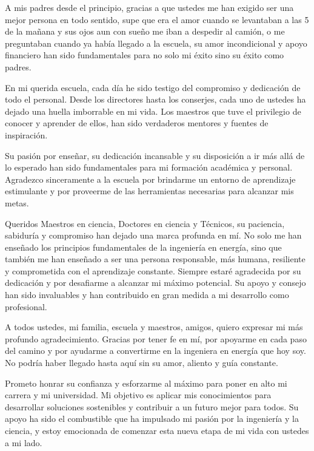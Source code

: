 \documentclass[12pt]{article}
\begin{document}
A mis padres desde el principio, gracias a que ustedes me han exigido ser una mejor persona en todo sentido, supe que era el amor cuando se levantaban a las 5 de la mañana y sus ojos aun con sueño me iban a despedir al camión, o me preguntaban cuando ya había llegado a la escuela, su amor incondicional y apoyo financiero han sido fundamentales para no solo mi éxito sino su éxito como padres.\vspace{1em} %

En mi querida escuela, cada día he sido testigo del compromiso y dedicación de todo el personal. Desde los directores hasta los conserjes, cada uno de ustedes ha dejado una huella imborrable en mi vida. Los maestros que tuve el privilegio de conocer y aprender de ellos, han sido verdaderos mentores y fuentes de inspiración.\vspace{1em} %

Su pasión por enseñar, su dedicación incansable y su disposición a ir más allá de lo esperado han sido fundamentales para mi formación académica y personal. Agradezco sinceramente a la escuela por brindarme un entorno de aprendizaje estimulante y por proveerme de las herramientas necesarias para alcanzar mis metas.\vspace{1em} %


Queridos Maestros en ciencia, Doctores en ciencia y Técnicos, su paciencia, sabiduría y compromiso han dejado una marca profunda en mí. No solo me han enseñado los principios fundamentales de la ingeniería en energía, sino que también me han enseñado a ser una persona responsable, más humana, resiliente y comprometida con el aprendizaje constante. Siempre estaré agradecida por su dedicación y por desafiarme a alcanzar mi máximo potencial. Su apoyo y consejo han sido invaluables y han contribuido en gran medida a mi desarrollo como profesional.\vspace{1em} %

A todos ustedes, mi familia, escuela y maestros, amigos, quiero expresar mi más profundo agradecimiento. Gracias por tener fe en mí, por apoyarme en cada paso del camino y por ayudarme a convertirme en la ingeniera en energía que hoy soy. No podría haber llegado hasta aquí sin su amor, aliento y guía constante.\vspace{1em} %


Prometo honrar su confianza y esforzarme al máximo para poner en alto mi carrera y mi universidad. Mi objetivo es aplicar mis conocimientos para desarrollar soluciones sostenibles y contribuir a un futuro mejor para todos. Su apoyo ha sido el combustible que ha impulsado mi pasión por la ingeniería y la ciencia, y estoy emocionada de comenzar esta nueva etapa de mi vida con ustedes a mi lado.\vspace{1em} %
\end{document}
